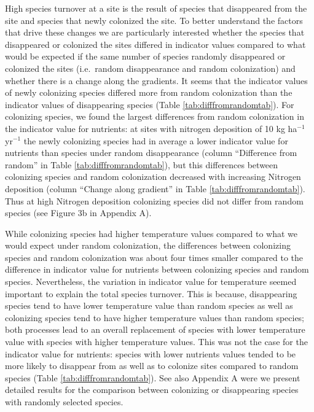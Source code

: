 \documentclass[fleqn,10pt,lineno]{wlpeerj} %
\theoremstyle{definition}
\theoremstyle{definition}
\theoremstyle{definition}
\theoremstyle{remark}
\begin{document}
High species turnover at a site is the result of species that
disappeared from the site and species that newly colonized the site. To
better understand the factors that drive these changes we are
particularly interested whether the species that disappeared or
colonized the sites differed in indicator values compared to what would
be expected if the same number of species randomly disappeared or
colonized the sites (i.e.~random disappearance and random colonization)
and whether there is a change along the gradients. It seems that the
indicator values of newly colonizing species differed more from random
colonization than the indicator values of disappearing species (Table
\ref{tab:difffromrandomtab}). For colonizing species, we found the
largest differences from random colonization in the indicator value for
nutrients: at sites with nitrogen deposition of 10 kg ha\(^{-1}\)
yr\(^{-1}\) the newly colonizing species had in average a lower
indicator value for nutrients than species under random disappearance
(column ``Difference from random'' in Table
\ref{tab:difffromrandomtab}), but this differences between colonizing
species and random colonization decreased with increasing Nitrogen
deposition (column ``Change along gradient'' in Table
\ref{tab:difffromrandomtab}). Thus at high Nitrogen deposition
colonizing species did not differ from random species (see Figure 3b in
Appendix A).

While colonizing species had higher temperature values compared to what
we would expect under random colonization, the differences between
colonizing species and random colonization was about four times smaller
compared to the difference in indicator value for nutrients between
colonizing species and random species. Nevertheless, the variation in
indicator value for temperature seemed important to explain the total
species turnover. This is because, disappearing species tend to have
lower temperature value than random species as well as colonizing
species tend to have higher temperature values than random species; both
processes lead to an overall replacement of species with lower
temperature value with species with higher temperature values. This was
not the case for the indicator value for nutrients: species with lower
nutrients values tended to be more likely to disappear from as well as
to colonize sites compared to random species (Table
\ref{tab:difffromrandomtab}). See also Appendix A were we present
detailed results for the comparison between colonizing or disappearing
species with randomly selected species.
\end{document}
